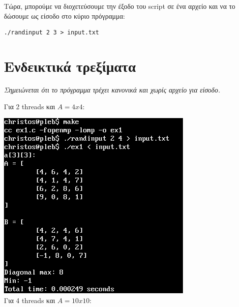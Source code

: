 \documentclass{article}
\begin{document}
Τώρα, μπορούμε να διοχετεύσουμε την έξοδο του script σε ένα αρχείο και να το
δώσουμε ως είσοδο στο κύριο πρόγραμμα:

\begin{lstlisting}
./randinput 2 3 > input.txt
\end{lstlisting}

\section{Ενδεικτικά τρεξίματα}

\textit{Σημειώνεται ότι το πρόγραμμα τρέχει κανονικά και χωρίς αρχείο για είσοδο.}

Για 2 threads και $A = 4x4$:

\includegraphics[width=\textwidth]{res/run1.png} \\

Για 4 threads και $A = 10x10$:
\end{document}
